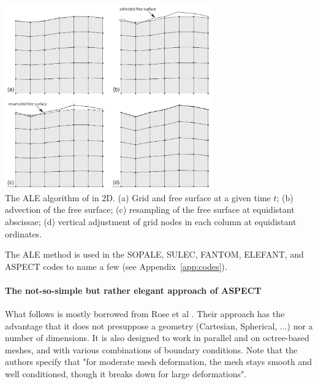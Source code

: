 \begin{center}
\includegraphics[width=9cm]{images/freesurface/ale2d}\\
 {\small The ALE algorithm of \cite{thie11} in 2D. 
(a) Grid and free surface at a given time $t$; 
(b) advection of the free surface; 
(c) resampling of the free surface at equidistant abscissae; 
(d) vertical adjustment of grid nodes in each column at equidistant ordinates.}
\end{center}

The ALE method is used in the SOPALE, SULEC, FANTOM, ELEFANT, and ASPECT codes to name a few
(see Appendix~\ref{app:codes}).

\paragraph{The not-so-simple but rather elegant approach of ASPECT}

What follows is mostly borrowed from Rose et al \cite{robh17}. Their approach 
has the advantage that it does not presuppose a geometry (Cartesian, Spherical, ...)
nor a number of dimensions. It is also designed to work in parallel and on octree-based
meshes, and with various combinations of boundary conditions.
Note that the authors specify that "for moderate mesh deformation, the mesh stays smooth and well
conditioned, though it breaks down for large deformations".

